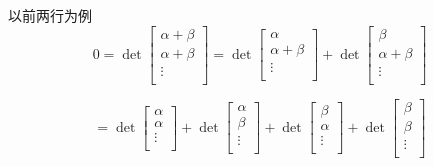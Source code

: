 \documentclass[UTF8]{ctexart}
\begin{document}
    \begin{prf}
        以前两行为例
        \[
    0 = \det\begin{bmatrix}
        \alpha+\beta  \\
        \alpha+\beta  \\
        \vdots   \\
        
    \end{bmatrix} 
    = \det  \begin{bmatrix}
        \alpha\\
        \alpha+\beta \\
        \vdots  \\
        
    \end{bmatrix} 
    + \det \begin{bmatrix}
        \beta  \\
        \alpha+\beta  \\
        \vdots  \\
        
    \end{bmatrix} 
    \]

    \[
    = \det \begin{bmatrix}
        \alpha   \\
        \alpha \\
        \vdots  \\
    
    \end{bmatrix} 
    + \det \begin{bmatrix}
    \alpha\\
        \beta \\
        \vdots  \\

    \end{bmatrix} 
    + \det \begin{bmatrix}
    \beta  \\
        \alpha   \\
        \vdots\\
    
    \end{bmatrix} 
    + \det \begin{bmatrix}
    \beta   \\
        \beta  \\
        \vdots  \\
    
    \end{bmatrix} 
    \]


\end{prf}
\end{document}
